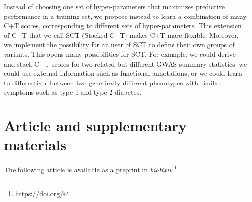 Instead of choosing one set of hyper-parameters that maximizes predictive performance in a training set, we propose instead to learn a combination of many C+T scores, corresponding to different sets of hyper-parameters.
This extension of C+T that we call SCT (Stacked C+T) makes C+T more flexible.
Moreover, we implement the possibility for an user of SCT to define their own groups of variants. This opens many possibilities for SCT. For example, we could derive and stack C+T scores for two related but different GWAS summary statistics, we could use external information such as functional annotations, or we could learn to differentiate between two genetically different phenotypes with similar symptoms such as type 1 and type 2 diabetes.


\section{Article and supplementary materials}

The following article is available as a preprint in \textit{bioRxiv}	\footnote{\url{https://doi.org/}}.
